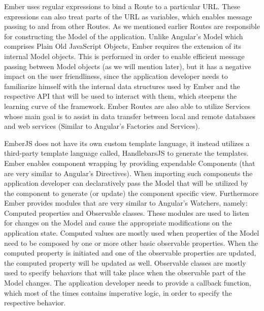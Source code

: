 {Ember uses regular expressions to bind a Route to a particular URL. These expressions can also treat parts of the URL as variables, which enables message passing to and from other Routes. As we mentioned earlier Routes are responsible for constructing the Model of the application. Unlike Angular's Model which comprises Plain Old JavaScript Objects, Ember requires the extension of its internal Model objects. This is performed in order to enable efficient message passing between Model objects (as we will mention later), but it has a negative impact on the user friendliness, since the application developer needs to familiarize himself with the internal data structures used by Ember and the respective API that will be used to interact with them, which steepens the learning curve of the framework. Ember Routes are also able to utilize Services whose main goal is to assist in data transfer between local and remote databases and web services (Similar to Angular's Factories and Services).



EmberJS does not have its own custom template language, it instead utilizes a third-party template language called, HandlebarsJS \cite{handlebars} to generate the templates. Ember enables component wrapping by providing expendable Components (that are very similar to Angular's Directives). When importing such components the application developer can declaratively pass the Model that will be utilized by the component to generate (or update) the component specific view. Furthermore Ember provides modules that are very similar to Angular's Watchers, namely: Computed properties and Observable classes. These modules are used to listen for changes on the Model and cause the appropriate modifications on the application state. Computed values are mostly used when properties of the Model need to be composed by one or more other basic observable properties. When the computed property is initiated and one of the observable properties are updated, the computed property will be updated as well. Observable classes are mostly used to specify behaviors that will take place when the observable part of the Model changes. The application developer needs to provide a callback function, which most of the times contains imperative logic, in order to specify the respective behavior. 



}
